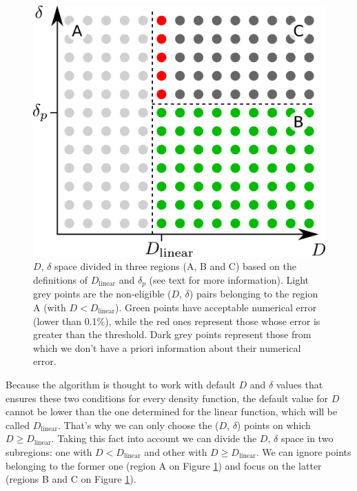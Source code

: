 \documentclass[extra]{gji}
\begin{document}
\begin{figure}
\centering
\includegraphics[width=\linewidth]
    {figures/D-delta-grid-search.pdf}
\caption{
    $D$, $\delta$ space divided in three regions (A, B and C) based on
    the definitions of $D_\text{linear}$ and $\delta_p$ (see text for more
    information).
    Light grey points are the non-eligible ($D$, $\delta$) pairs
    belonging to the region A (with $D < D_\text{linear}$).
    Green points have acceptable numerical error (lower than 0.1\%),
    while the red ones represent those whose error is greater than the
    threshold.
    Dark grey points represent those from which we don't have a priori
    information about their numerical error.}
\label{fig:D-delta-grid-search}
\end{figure}

Because the algorithm is thought to work with default $D$ and $\delta$
values that ensures these two conditions for every density function,
the default value for $D$ cannot be lower than the one determined for
the linear function, which will be called $D_\text{linear}$.
That's why we can only choose the ($D$, $\delta$) points on which
$D \geq D_\text{linear}$.
Taking this fact into account we can divide the $D$, $\delta$ space in
two subregions: one with $D < D_\text{linear}$ and other with $D \ge
D_\text{linear}$.
We can ignore points belonging to the former one (region A on Figure
\ref{fig:D-delta-grid-search}) and focus on the latter (regions B and C on
Figure \ref{fig:D-delta-grid-search}).
\end{document}
